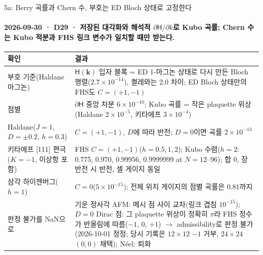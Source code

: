 \begin{frame}[label=stage5a]{5a: Berry 곡률과 Chern 수, 부호는 ED Bloch 상태로 고정한다}
  \framesubtitle{2026-09-30 · D29 · 저장된 대각화와 해석적 $\partial\mathsf H/\partial k$로 Kubo 곡률; Chern 수는 Kubo 적분과 FHS 링크 변수가 일치할 때만 받는다.}
  \footnotesize\renewcommand{\arraystretch}{1.06}
  \begin{tabularx}{\textwidth}{@{}P{3.4cm}Y@{}}
    \toprule
    확인 & 결과 \\
    \midrule
    부호 기준(Haldane 마그논) & $\mathsf H(\mathbf k)$ 입자 블록 = ED 1-마그논 상태로 다시 만든 Bloch 행렬($2.7\times10^{-14}$), 켤레와는 2.0 차이; ED Bloch 상태만의 FHS도 $C=(+1,-1)$ \\
    점별 & $\partial\mathsf H$ 중앙 차분 $6\times10^{-10}$; Kubo 곡률 = 작은 plaquette 위상(Haldane $2\times10^{-5}$, 키타에프 $3\times10^{-4}$) \\
    Haldane($J=1$, $D=\pm0.2$, $h=0.3$) & $C=(+1,-1)$, $D$에 따라 반전; $D=0$이면 곡률 $2\times10^{-13}$ \\
    키타에프 [111] 편극($K=-1$, 이상항 포함) & FHS $C=(+1,-1)$($h=0.5,1,2$); Kubo 수렴($h=2$: 0.775, 0.970, 0.99956, 0.9999999 at $N=12$--96); 합 0, 장 반전 시 반전, 셀 게이지 동일 \\
    삼각 하이젠버그($h=1$) & $C=0$($5\times10^{-15}$); 전체 위치 게이지의 점별 곡률은 0.81까지 \\
    판정 불가를 NaN으로 & 기운 정사각 AFM: 메시 점 사이 교차(링크 겹침 $10^{-15}$); $D=0$ Dirac 점: 그 plaquette 위상이 정확히 $\pi$라 FHS 정수가 반올림에 따름($-1$, 0, $+1$) $\to$ admissibility로 판정 불가(2026-10-01 정정; 당시 기록은 $12\times12$ $-1$ 거부, $24\times24$ $(0,0)$ 채택); Néel: 퇴화 \\
    \bottomrule
  \end{tabularx}
  \par\smallskip
\end{frame}

